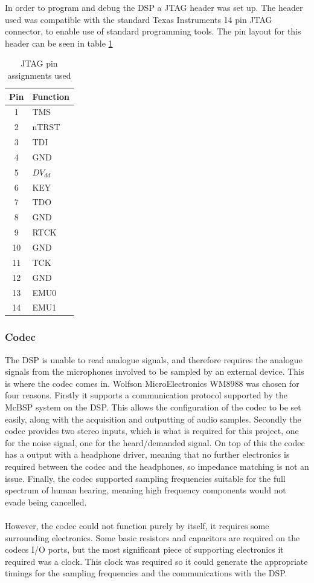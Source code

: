 \noindent In order to program and debug the DSP a JTAG header was set up.
The header used was compatible with the standard Texas Instruments 14 pin JTAG connector, to enable use of standard programming tools.
The pin layout for this header can be seen in table \ref{tab:jtagpinout}

\begin{table}[H]
	\centering
	\begin{tabular}[c]{| c | l |}
		\hline
		Pin	& Function	\\
		\hline
		1	& TMS		\\
		2	& nTRST		\\
		3	& TDI		\\
		4	& GND		\\
		5	& $DV_{dd}$	\\
		6	& KEY		\\
		7	& TDO		\\
		8	& GND		\\
		9	& RTCK		\\
		10	& GND		\\
		11	& TCK		\\
		12	& GND		\\
		13	& EMU0		\\
		14	& EMU1		\\
		\hline
	\end{tabular}
	\caption{JTAG pin assignments used}
	\label{tab:jtagpinout}
\end{table}

\subsubsection{Codec}
The DSP is unable to read analogue signals, and therefore requires the analogue signals from the microphones involved to be sampled by an external device.
This is where the codec comes in.
Wolfson MicroElectronics WM8988 was chosen for four reasons.
Firstly it supports a communication protocol supported by the McBSP system on the DSP.
This allows the configuration of the codec to be set easily, along with the acquisition and outputting of audio samples.
Secondly the codec provides two stereo inputs, which is what is required for this project, one for the noise signal, one for the heard/demanded signal.
On top of this the codec has a output with a headphone driver, meaning that no further electronics is required between the codec and the headphones, so impedance matching is not an issue.
Finally, the codec supported sampling frequencies suitable for the full spectrum of human hearing, meaning high frequency components would not evade being cancelled.
\\
\\
However, the codec could not function purely by itself, it requires some surrounding electronics.
Some basic resistors and capacitors are required on the codecs I/O ports, but the most significant piece of supporting electronics it required was a clock.
This clock was required so it could generate the appropriate timings for the sampling frequencies and the communications with the DSP.

